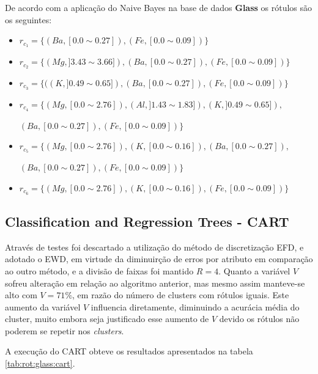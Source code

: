 De acordo com a aplicação do Naive Bayes na base de dados \textbf{Glass} os rótulos são os seguintes:
\begin{itemize}[noitemsep]
 \item ${r_{c_1}=\{ (Ba,[ 0.0 \sim 0.27 ] ),(Fe,[ 0.0 \sim 0.09 ] ) \} }$  
 \item ${r_{c_2}=\{ (Mg,] 3.43 \sim  3.66 ] ),(Ba,[ 0.0 \sim 0.27 ] ),(Fe,[ 0.0 \sim 0.09 ] ) \} }$
 \item ${r_{c_3}=\{ ((K,] 0.49 \sim  0.65 ] ),(Ba,[ 0.0 \sim 0.27 ] ),(Fe,[ 0.0 \sim 0.09 ] )  \} }$  
 \item ${r_{c_4}=\{ (Mg,[ 0.0 \sim  2.76 ] ),(Al,] 1.43 \sim 1.83 ] ), (K,] 0.49 \sim  0.65 ] ),}$

 ${ (Ba,[ 0.0 \sim 0.27 ] ),(Fe,[ 0.0 \sim 0.09 ] ) \} }$
 \item ${r_{c_5}=\{  (Mg,[ 0.0 \sim  2.76 ] ), (K,[ 0.0 \sim  0.16 ] ),(Ba,[ 0.0 \sim 0.27 ] ), }$
 
 ${ (Ba,[ 0.0 \sim 0.27 ] ),(Fe,[ 0.0 \sim 0.09 ] ) \} }$
 \item ${r_{c_6}=\{ (Mg,[ 0.0 \sim  2.76 ] ),  (K,[ 0.0 \sim  0.16 ] ),(Fe,[ 0.0 \sim 0.09 ] ) \} }$
\end{itemize}


\subsection{Classification and Regression Trees - CART} \label{cap:resultados:ssec:glass:cart}


Através de testes foi descartado a utilização do método de discretização EFD, e adotado o EWD, em virtude da diminuirção de erros por atributo em comparação ao outro método, e a divisão de faixas foi mantido ${R=4}$. Quanto a variável ${V}$ sofreu alteração em relação ao algoritmo anterior, mas mesmo assim manteve-se alto com ${V=71\%}$, em razão do número de clusters com rótulos iguais. Este aumento da variável ${V}$ influencia diretamente, diminuindo a acurácia média do cluster, muito embora seja justificado esse aumento de ${V}$ devido os rótulos não poderem se repetir nos \textit{clusters}.

A execução do CART obteve os resultados apresentados na tabela \ref{tab:rot:glass:cart}.

